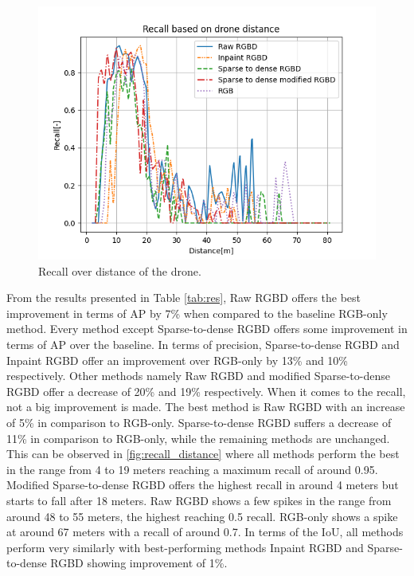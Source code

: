 \documentclass[twoside]{ctuthesis}
\theoremstyle{plain}
\theoremstyle{definition}
\theoremstyle{note}
\begin{document}
\begin{figure}
	\centering
	\includegraphics[width=\textwidth]{recall_distance.png}
	\caption{Recall over distance of the drone.} \label{fig:recall_distance}
\end{figure}
From the results presented in Table \ref{tab:res}, Raw RGBD offers the best improvement in terms of AP by 7\% when compared to the baseline RGB-only method. Every method except Sparse-to-dense RGBD offers some improvement in terms of AP over the baseline. In terms of precision, Sparse-to-dense RGBD and Inpaint RGBD offer an improvement over RGB-only by 13\% and 10\% respectively. Other methods namely Raw RGBD and modified Sparse-to-dense RGBD offer a decrease of 20\% and 19\% respectively. When it comes to the recall, not a big improvement is made. The best method is Raw RGBD with an increase of 5\% in comparison to RGB-only. Sparse-to-dense RGBD suffers a decrease of 11\% in comparison to RGB-only, while the remaining methods are unchanged. This can be observed in \autoref{fig:recall_distance} where all methods perform the best in the range from 4 to 19 meters reaching a maximum recall of around 0.95. Modified Sparse-to-dense RGBD offers the highest recall in around 4 meters but starts to fall after 18 meters. Raw RGBD shows a few spikes in the range from around 48 to 55 meters, the highest reaching 0.5 recall. RGB-only shows a spike at around 67 meters with a recall of around 0.7. In terms of the IoU, all methods perform very similarly with best-performing methods Inpaint RGBD and Sparse-to-dense RGBD showing improvement of 1\%.
\end{document}
